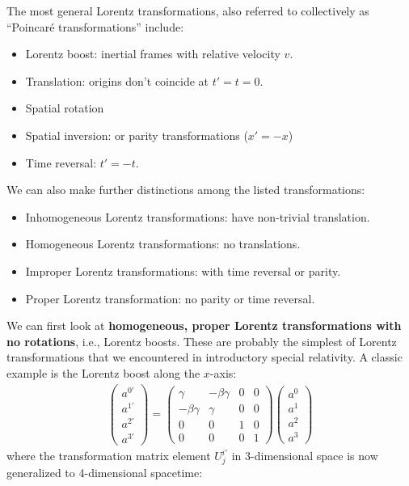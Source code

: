 \documentclass{book}
\theoremstyle{definition}
\begin{document}
The most general Lorentz transformations, also referred to collectively as ``Poincar\'e transformations'' include:
\begin{itemize}
	\item Lorentz boost: inertial frames with relative velocity $v$.
	\item Translation: origins don't coincide at $t'=t=0$.
	\item Spatial rotation
	\item Spatial inversion: or parity transformations ($x' = -x$)
	\item Time reversal: $t'=-t$.
\end{itemize} 
We can also make further distinctions among the listed transformations:
\begin{itemize}
	\item Inhomogeneous Lorentz transformations: have non-trivial translation.
	\item Homogeneous Lorentz transformations: no translations.
	\item Improper Lorentz transformations: with time reversal or parity.
	\item Proper Lorentz transformation: no parity or time reversal.
\end{itemize}
We can first look at \textbf{homogeneous, proper Lorentz transformations with no rotations}, i.e., Lorentz boosts. These are probably the simplest of Lorentz transformations that we encountered in introductory special relativity. A classic example is the Lorentz boost along the $x$-axis:
\begin{align*}
\begin{pmatrix}
a^{0'}\\a^{1'}\\a^{2'}\\a^{3'}
\end{pmatrix}
=
\begin{pmatrix}
\gamma & -\beta\gamma & 0 & 0\\
-\beta\gamma & \gamma & 0 & 0\\
0 & 0 & 1 & 0\\
0 & 0 & 0 & 1
\end{pmatrix}
\begin{pmatrix}
a^{0}\\a^{1}\\a^{2}\\a^{3}
\end{pmatrix}
\end{align*}
where the transformation matrix element $U^{i'}_j$ in 3-dimensional space is now generalized to 4-dimensional spacetime:
\end{document}
